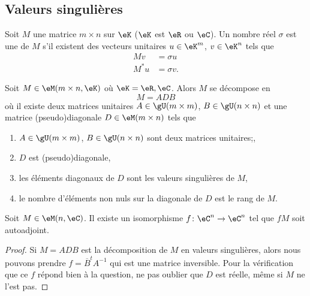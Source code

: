 \subsection{Valeurs singulières}

\begin{definition}
    Soit \( M\) une matrice \( m\times n\) sur \( \eK\) (\( \eK\) est \( \eR\) ou \(
    \eC\)). Un nombre réel \( \sigma\) est une 
    de \( M\) s'il existent des vecteurs unitaires \( u\in \eK^m\), \( v\in \eK^n\) tels que
    \begin{subequations}
        \begin{align}
            Mv&=\sigma u\\
            M^*u&=\sigma v.
        \end{align}
    \end{subequations}
\end{definition}

\begin{theorem}
    Soit \( M\in \eM(m\times n,\eK)\) où \( \eK=\eR,\eC\). Alors \( M\) se décompose en
    \begin{equation}
        M=ADB
    \end{equation}
    où
    il existe deux matrices unitaires \( A\in \gU(m\times m)\), \( B\in \gU(n\times n)\) et une matrice (pseudo)diagonale \( D\in \eM(m\times n)\) tels que
    \begin{enumerate}
        \item 
            \( A\in\gU(m\times m)\), \( B\in\gU(n\times n)\) sont deux matrices unitaires;,
        \item
            \( D\) est (pseudo)diagonale,
        \item
            les éléments diagonaux de \( D\) sont les valeurs singulières de \( M\),
        \item
            le nombre d'éléments non nuls sur la diagonale de \( D\) est le rang de \( M\).
    \end{enumerate}
\end{theorem}

\begin{corollary}
    Soit \( M\in \eM(n,\eC)\). Il existe un isomorphisme \( f\colon \eC^n\to \eC^n\) tel que \( fM\) soit autoadjoint.
\end{corollary}

\begin{proof}
    Si \( M=ADB\) est la décomposition de \( M\) en valeurs singulières, alors nous pouvons prendre \( f=\overline{ B }^tA^{-1}\) qui est une matrice inversible. Pour la vérification que ce \( f\) répond bien à la question, ne pas oublier que \( D\) est réelle, même si \( M\) ne l'est pas.
\end{proof}
